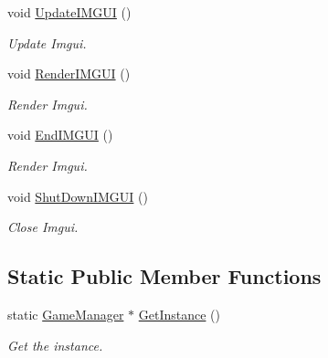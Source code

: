 \begin{DoxyCompactItemize}
void \hyperlink{class_game_manager_ae8672e78febd97d68dd42b9e843b3527}{Update\+I\+M\+G\+UI} ()
\begin{DoxyCompactList}\small\item\em Update Imgui. \end{DoxyCompactList}\item 
\mbox{\label{class_game_manager_a2bb8e4c7d0c8438a4c2bbeb17c808c37}} 
void \hyperlink{class_game_manager_a2bb8e4c7d0c8438a4c2bbeb17c808c37}{Render\+I\+M\+G\+UI} ()
\begin{DoxyCompactList}\small\item\em Render Imgui. \end{DoxyCompactList}\item 
\mbox{\label{class_game_manager_a957ca0e6277341d2473e6b9ba3c2346f}} 
void \hyperlink{class_game_manager_a957ca0e6277341d2473e6b9ba3c2346f}{End\+I\+M\+G\+UI} ()
\begin{DoxyCompactList}\small\item\em Render Imgui. \end{DoxyCompactList}\item 
\mbox{\label{class_game_manager_a6b74f0e67d6407fe9852250aff423269}} 
void \hyperlink{class_game_manager_a6b74f0e67d6407fe9852250aff423269}{Shut\+Down\+I\+M\+G\+UI} ()
\begin{DoxyCompactList}\small\item\em Close Imgui. \end{DoxyCompactList}\end{DoxyCompactItemize}
\subsection*{Static Public Member Functions}
\begin{DoxyCompactItemize}
\item 
\mbox{\label{class_game_manager_ad2f647253a04cdf60e3bff6fede8a30b}} 
static \hyperlink{class_game_manager}{Game\+Manager} $\ast$ \hyperlink{class_game_manager_ad2f647253a04cdf60e3bff6fede8a30b}{Get\+Instance} ()
\begin{DoxyCompactList}\small\item\em Get the instance. \end{DoxyCompactList}\end{DoxyCompactItemize}
